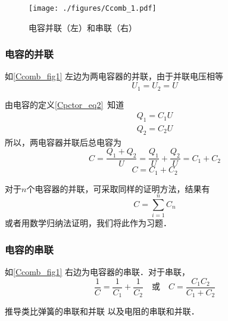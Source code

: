 

\begin{figure}[ht]
\centering
\texttt{[image: ./figures/Ccomb\_1.pdf]}
\caption{电容并联（左）和串联（右）} \label{Ccomb_fig1}
\end{figure}

\subsubsection{电容的并联}
如\autoref{Ccomb_fig1} 左边为两电容器的并联，由于并联电压相等
\begin{equation}
U_1=U_2=U
\end{equation}

由电容的定义\autoref{Cpctor_eq2}~知道
\begin{equation}
\begin{aligned}
Q_1=C_1U\\
Q_2=C_2U
\end{aligned}
\end{equation}
所以，两电容器并联后总电容为
\begin{equation}
C=\frac{Q_1+Q_2}{U}=\frac{Q_1}{U}+\frac{Q_2}{U}=C_1+C_2
\end{equation}
\begin{equation}
C = C_1 + C_2
\end{equation}

对于$n$个电容器的并联，可采取同样的证明方法，结果有
\begin{equation}
C=\sum_{i=1}^{n}C_n
\end{equation}
或者用数学归纳法证明，我们将此作为习题．


\subsubsection{电容的串联}
如\autoref{Ccomb_fig1} 右边为电容器的串联．对于串联，
\begin{equation}
\frac{1}{C} = \frac{1}{C_1} + \frac{1}{C_2}
\quad \text{或} \quad
C = \frac{C_1C_2}{C_1 + C_2}
\end{equation}

推导类比弹簧的串联和并联 以及电阻的串联和并联．
